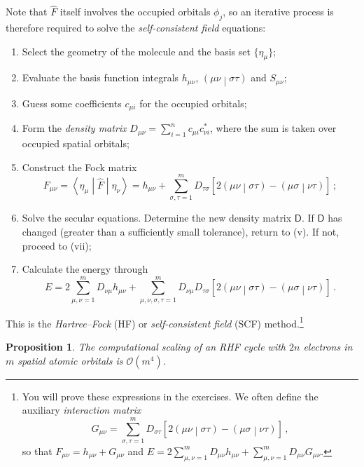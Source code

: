 \documentclass{article}
\theoremstyle{plain}\theoremheaderfont{\normalfont\itshape}\theorembodyfont{\rmfamily}\theoremseparator{.}\newtheorem*{rem}{Remark}\newtheorem*{ex}{Example}\newtheorem*{proof}{Proof}\newtheorem*{altp}{Alternative proof}
\theoremstyle{plain}\theoremheaderfont{\normalfont\bfseries}\theorembodyfont{\rmfamily}\theoremseparator{.}\newtheorem{thm}{Theorem}[section]\newtheorem{lem}[thm]{Lemma}\newtheorem{prop}[thm]{Proposition}\newtheorem*{cor}{Corollary}\newtheorem{defn}[thm]{Definition}\newtheorem{clm}[thm]{Claim}\newtheorem{clminproof}{Claim}
\theoremstyle{break}\theoremheaderfont{\normalfont\itshape}\theorembodyfont{\rmfamily}\theoremseparator{.\medskip}\newtheorem*{proofskip}{Proof}\newtheorem*{exs}{Examples}\newtheorem*{rems}{Remarks}
\theoremstyle{break}\theoremheaderfont{\normalfont\bfseries}\theorembodyfont{\rmfamily}\theoremseparator{.\medskip}\newtheorem{lemskip}[thm]{Lemma}\newtheorem{defnskip}[thm]{Definition}\newtheorem{propskip}[thm]{Proposition}\newtheorem{thmskip}[thm]{Theorem}
\numberwithin{equation}{section}
\newcommand{\mel}[3]{\left\langle #1 \middle| #2 \middle| #3 \right\rangle}
\newcommand{\bracket}[2]{\left( #1 \middle| #2 \right)}
\begin{document}
    Note that \(\hat{F}\) itself involves the occupied orbitals \(\phi_j\), so an iterative process is therefore required to solve the \textit{self-consistent field} equations:
    \begin{enumerate}[topsep=0pt,label=(\roman*)]
        \item Select the geometry of the molecule and the basis set \(\{\eta_\mu\}\);
        \item Evaluate the basis function integrals \(h_{\mu\nu}\), \(\bracket{\mu\nu}{\sigma\tau}\) and \(S_{\mu\nu}\);
        \item Guess some coefficients \(c_{\mu i}\) for the occupied orbitals;
        \item Form the \textit{density matrix} \(D_{\mu\nu}=\sum_{i=1}^{n}c_{\mu i}c_{\nu i}^*\), where the sum is taken over occupied spatial orbitals;
        \item Construct the Fock matrix
        \begin{equation}
            F_{\mu\nu}=\mel{\eta_\mu}{\hat{F}}{\eta_\nu}=h_{\mu\nu}+\sum_{\sigma,\tau=1}^{m}D_{\tau\sigma}[2\bracket{\mu\nu}{\sigma\tau}-\bracket{\mu\sigma}{\nu\tau}]\,;
        \end{equation}
        \item Solve the secular equations. Determine the new density matrix \(\mathsf{D}\). If \(\mathsf{D}\) has changed (greater than a sufficiently small tolerance), return to (v). If not, proceed to (vii);
        \item Calculate the energy through
        \begin{equation}
            E=2\sum_{\mu,\nu=1}^{m}D_{\nu\mu}h_{\mu\nu}+\sum_{\mu,\nu,\sigma,\tau=1}^{m}D_{\nu\mu}D_{\tau\sigma}[2\bracket{\mu\nu}{\sigma\tau}-\bracket{\mu\sigma}{\nu\tau}]\,.
        \end{equation}
    \end{enumerate}
    This is the \textit{Hartree--Fock} (HF) or \textit{self-consistent field} (SCF) method.\footnote{You will prove these expressions in the exercises. We often define the auxiliary \textit{interaction matrix}
    \begin{equation}
        G_{\mu\nu}=\sum_{\sigma,\tau=1}^{m}D_{\sigma\tau}[2\bracket{\mu\nu}{\sigma\tau}-\bracket{\mu\sigma}{\nu\tau}]\,,
    \end{equation}
    so that \(F_{\mu\nu}=h_{\mu\nu}+G_{\mu\nu}\) and \(E=2\sum_{\mu,\nu=1}^{m}D_{\mu\nu}h_{\mu\nu}+\sum_{\mu,\nu=1}^{m}D_{\mu\nu}G_{\mu\nu}\).}
    \begin{prop}
        The computational scaling of an RHF cycle with \(2n\) electrons in \(m\) spatial atomic orbitals is \(\mathcal{O}(m^4)\).
    \end{prop}
\end{document}
